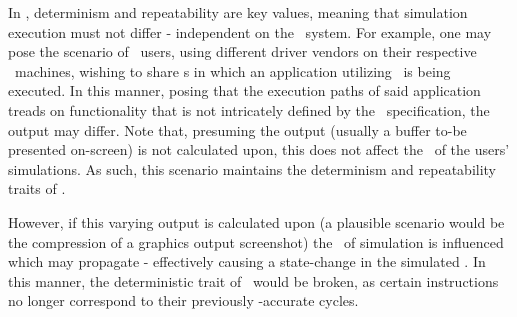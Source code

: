 In \termsimics , determinism and repeatability are key values, meaning that simulation execution must not differ - independent on the \termhost\ system.
For example, one may pose the scenario of \termsimics\ users, using different driver vendors on their respective \termhost\ machines, wishing to share \termcheckpoint s in which an application utilizing \termopengles\ is being executed.
In this manner, posing that the execution paths of said application treads on functionality that is not intricately defined by the \termopengles\ specification, the output may differ.
Note that, presuming the output (usually a buffer to-be presented on-screen) is not calculated upon, this does not affect the \termtiming\ of the users' simulations.
As such, this scenario maintains the determinism and repeatability traits of \termsimics .

However, if this varying output is calculated upon (a plausible scenario would be the compression of a graphics output screenshot) the \termtiming\ of simulation is influenced which may propagate - effectively causing a state-change in the simulated \termcpu .
In this manner, the deterministic trait of \termsimics\ would be broken, as certain instructions no longer correspond to their previously \termtiming -accurate cycles.
